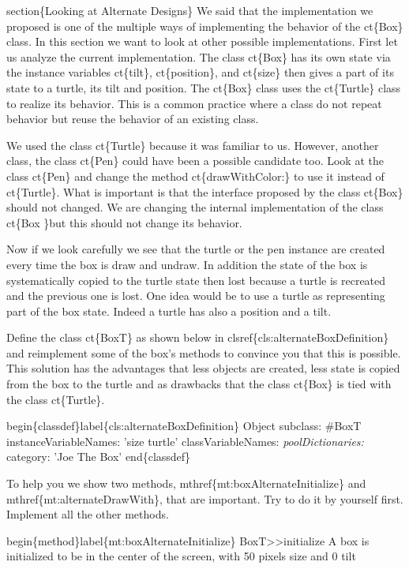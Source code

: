 \documentclass[10pt,twoside,english]{_support/latex/sbabook/sbabook}
\begin{document}
section\{Looking at Alternate  Designs\}
We said that the implementation we proposed is one of the multiple
ways of implementing the behavior of the ct\{Box\} class. In this
section we want to look at other possible implementations.  First let
us analyze the current implementation.  The class ct\{Box\} has its own
state via the instance variables ct\{tilt\}, ct\{position\}, and
ct\{size\} then gives a part of its state to a turtle, its tilt and 
position.  The ct\{Box\} class uses the ct\{Turtle\} class to realize
its behavior.  This is a common practice where a class do not repeat
behavior but reuse the behavior of an existing class.

We used the class ct\{Turtle\} because it was familiar to us.  However,
another class, the class ct\{Pen\} could have been a possible candidate
too.  Look at the class ct\{Pen\} and change the method
ct\{drawWithColor:\} to use it instead of ct\{Turtle\}.  What is
important is that the interface proposed by the class ct\{Box\} should
not changed.  We are changing the internal implementation of the class
ct\{Box \}but this should not change its behavior.

Now if we look carefully we see that the turtle or the pen instance
are created every time the box is draw and undraw.  In addition the
state of the box is systematically copied to the turtle state then
lost because a turtle is recreated and the previous one is lost.  One
idea would be to use a turtle as representing part of the box state.
Indeed a turtle has also a position and a tilt.  

Define the class ct\{BoxT\} as shown below in
clsref\{cls:alternateBoxDefinition\} and reimplement some of the box's
methods to convince you that this is possible. This solution has the
advantages that less objects are created, less state is copied from
the box to the turtle and as drawbacks that the class ct\{Box\} is tied
with the class ct\{Turtle\}.

begin\{classdef\}label\{cls:alternateBoxDefinition\}
Object subclass: \#BoxT
   instanceVariableNames: 'size turtle'
   classVariableNames: \textit{
   poolDictionaries: }
   category: 'Joe The Box'
end\{classdef\}

To help you we show two methods, mthref\{mt:boxAlternateInitialize\} and 
mthref\{mt:alternateDrawWith\}, that are important. Try to do it by 
yourself first. Implement all the other methods. 

begin\{method\}label\{mt:boxAlternateInitialize\}
BoxT\textgreater{}\textgreater{}initialize
   A box is initialized to be in the center of the screen, with 
   50 pixels size and 0 tilt
   
\end{document}
